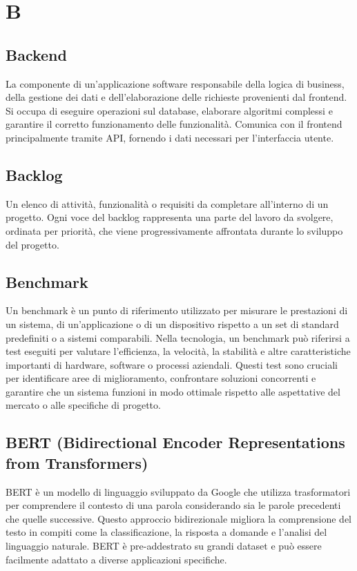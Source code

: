 \documentclass{article}
\begin{document}
\newpage
\section{B}

\subsection{Backend}
La componente di un'applicazione software responsabile della logica di business, della gestione dei dati e dell'elaborazione delle richieste provenienti dal frontend. Si occupa di eseguire operazioni sul database, elaborare algoritmi complessi e garantire il corretto funzionamento delle funzionalità. Comunica con il frontend principalmente tramite API, fornendo i dati necessari per l'interfaccia utente.

\subsection{Backlog}
Un elenco di attività, funzionalità o requisiti da completare all'interno di un progetto. Ogni voce del backlog rappresenta una parte del lavoro da svolgere, ordinata per priorità, che viene progressivamente affrontata durante lo sviluppo del progetto.
 
\subsection{Benchmark}
Un benchmark è un punto di riferimento utilizzato per misurare le prestazioni di un sistema, di un'applicazione o di un dispositivo rispetto a un set di standard predefiniti o a sistemi comparabili. Nella tecnologia, un benchmark può riferirsi a test eseguiti per valutare l'efficienza, la velocità, la stabilità e altre caratteristiche importanti di hardware, software o processi aziendali. Questi test sono cruciali per identificare aree di miglioramento, confrontare soluzioni concorrenti e garantire che un sistema funzioni in modo ottimale rispetto alle aspettative del mercato o alle specifiche di progetto.

\subsection{BERT (Bidirectional Encoder Representations from Transformers)}
BERT è un modello di linguaggio sviluppato da Google che utilizza trasformatori per comprendere il contesto di una parola considerando sia le parole precedenti che quelle successive. Questo approccio bidirezionale migliora la comprensione del testo in compiti come la classificazione, la risposta a domande e l'analisi del linguaggio naturale. BERT è pre-addestrato su grandi dataset e può essere facilmente adattato a diverse applicazioni specifiche.
\end{document}
